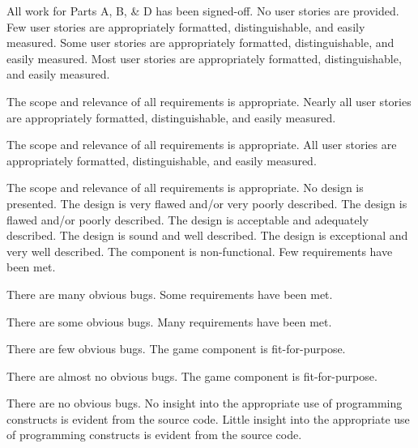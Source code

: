 \documentclass{../fal_assignment}
\begin{document}
\begin{markingrubric}
%
        \grade 		All work for Parts A, B, \& D has been signed-off.
%
        \grade\fail 	No user stories are provided.
        \grade 		Few user stories are appropriately formatted, distinguishable, and easily measured.
        \grade 		Some user stories are appropriately formatted, distinguishable, and easily measured.
        \grade 		Most user stories are appropriately formatted, distinguishable, and easily measured.
        \par 		The scope and relevance of all requirements is appropriate.
        \grade 		Nearly all user stories are appropriately formatted, distinguishable, and easily measured.
        \par 		The scope and relevance of all requirements is appropriate.
        \grade 		All user stories are appropriately formatted, distinguishable, and easily measured.
        \par 		The scope and relevance of all requirements is appropriate.
%
        \grade\fail 	No design is presented.
        \grade 		The design is very flawed and/or very poorly described.
        \grade 		The design is flawed and/or poorly described.
        \grade 		The design is acceptable and adequately described.
        \grade 		The design is sound and well described.
        \grade 		The design is exceptional and very well described.
%
        \grade\fail 	The component is non-functional.
        \grade 		Few requirements have been met.
        \par 		There are many obvious bugs.
        \grade 		Some requirements have been met.
        \par 		There are some obvious bugs.
        \grade 		Many requirements have been met.
        \par 		There are few obvious bugs.
        \grade 		The game component is fit-for-purpose.
        \par 		There are almost no obvious bugs.
        \grade 		The game component is fit-for-purpose.
        \par 		There are no obvious bugs.
%
        \grade\fail 	No insight into the appropriate use of programming constructs is evident from the source code.
        \grade 		Little insight into the appropriate use of programming constructs is evident from the source code.

\end{markingrubric}
\end{document}
